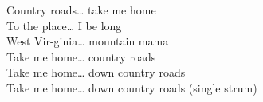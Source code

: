 Country  roads… take me  home\\
To the  place… I be long\\
West Vir-ginia… mountain  mama\\
Take me  home… country  roads\\
Take me  home… down country  roads\\
Take me  home… down country  roads  (single strum)\\






